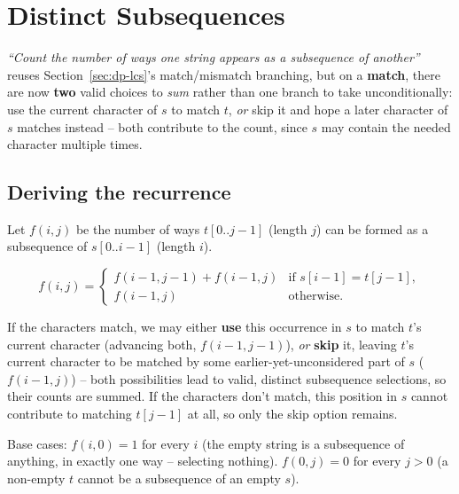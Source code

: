 \section{Distinct Subsequences}
\label{sec:dp-distinct-subsequences}


\begin{patternbox}
\emph{``Count the number of ways one string appears as a subsequence of
another''} reuses Section~\ref{sec:dp-lcs}'s match/mismatch branching,
but on a \textbf{match}, there are now \textbf{two} valid choices to
\emph{sum} rather than one branch to take unconditionally: use the
current character of $s$ to match $t$, \emph{or} skip it and hope a
later character of $s$ matches instead -- both contribute to the count,
since $s$ may contain the needed character multiple times.
\end{patternbox}

\subsection*{Deriving the recurrence}

Let $f(i,j)$ be the number of ways $t[0..j-1]$ (length $j$) can be
formed as a subsequence of $s[0..i-1]$ (length $i$).

\[
  f(i,j) =
  \begin{cases}
    f(i{-}1,j{-}1) + f(i{-}1,j) & \text{if } s[i{-}1]=t[j{-}1], \\
    f(i{-}1,j) & \text{otherwise.}
  \end{cases}
\]

If the characters match, we may either \textbf{use} this occurrence in
$s$ to match $t$'s current character (advancing both, $f(i{-}1,j{-}1)$),
\emph{or} \textbf{skip} it, leaving $t$'s current character to be
matched by some earlier-yet-unconsidered part of $s$ ($f(i{-}1,j)$) --
both possibilities lead to valid, distinct subsequence selections, so
their counts are summed. If the characters don't match, this position
in $s$ cannot contribute to matching $t[j-1]$ at all, so only the skip
option remains.

Base cases: $f(i,0)=1$ for every $i$ (the empty string is a subsequence
of anything, in exactly one way -- selecting nothing). $f(0,j)=0$ for
every $j>0$ (a non-empty $t$ cannot be a subsequence of an empty $s$).

